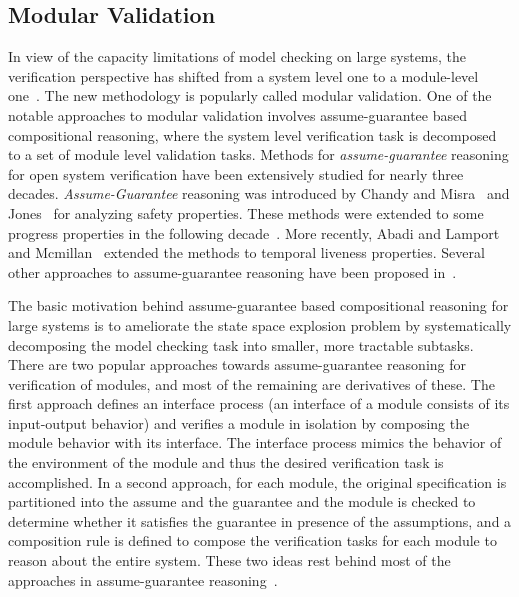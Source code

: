 \subsection{Modular Validation}
In view of the capacity limitations of model checking on large systems, the
verification perspective has shifted from a system level one to a module-level
one~\cite{kupferman:96}. The new methodology is popularly called 
modular validation. One of the
notable approaches to modular validation involves assume-guarantee based
compositional reasoning, where the system level verification task is
decomposed to a set of module level validation tasks.
Methods for {\em assume-guarantee} reasoning for open system verification
have been extensively studied for nearly three decades. {\em Assume-Guarantee}
reasoning was introduced by Chandy and Misra~\cite{chandy:81} and
Jones~\cite{jones} for analyzing safety properties. These methods were
extended to some progress properties in the following decade~\cite{panda}.
More recently, Abadi and Lamport~\cite{abadi:95} and Mcmillan~\cite{mcmillan}
extended the methods to temporal liveness properties. Several other
approaches to assume-guarantee reasoning have been proposed
in~\cite{kurshan:94,roever,stark}.

\noindent
The basic motivation behind assume-guarantee based compositional reasoning for
large systems is to ameliorate the state space explosion problem by
systematically decomposing the model checking task into smaller, more
tractable subtasks. There are two popular approaches towards assume-guarantee
reasoning for verification of modules, and most of the remaining are
derivatives of these. The first approach defines an interface
process (an interface of a module consists of its input-output behavior)
and verifies a module in isolation by composing the module
behavior with its interface. The interface process mimics the behavior of the
environment of the module and thus the desired verification task is
accomplished. In a second approach, for each module, the original
specification is partitioned into the assume and the guarantee
and the module is checked to determine whether it satisfies the guarantee
in presence of the assumptions, and a composition rule is defined to compose
the verification tasks for each module to reason about the entire system.
These two ideas rest behind most of the approaches in assume-guarantee
reasoning~\cite{abadi:95,chandy:81,henzinger:00,jones,josko,panda,roever,stark}.

